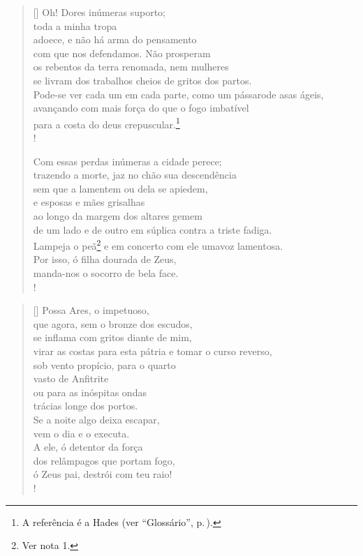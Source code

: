 \pagebreak
{}
\settowidth{\versewidth}{brilhante? Tenso, agito-me com medo em meu trêmulo}
\begin{verse}[\versewidth]
Oh! Dores inúmeras suporto;\\
toda a minha tropa\\
adoece, e não há arma do pensamento\\
com que nos defendamos. Não prosperam\\
os rebentos da terra renomada, nem mulheres\\
se livram dos trabalhos cheios de gritos dos partos.\\
Pode-se ver cada um em cada parte, como um pássaro\qb de asas ágeis,\\
avançando com mais força do que o fogo imbatível\\
para a costa do deus crepuscular.\footnote{A referência é a Hades (ver ``Glossário'', p.\,\pageref{glossario}).}\\!

Com essas perdas inúmeras a cidade perece;\\ %
trazendo a morte, jaz no chão sua descendência\\
sem que a lamentem ou dela se apiedem,\\
e esposas e mães grisalhas\\
ao longo da margem dos altares gemem\\
de um lado e de outro em súplica contra a triste fadiga.\\
Lampeja o peã\footnote{Ver nota 1.} %
e em concerto com ele uma\qb voz lamentosa.\\
Por isso, ó filha dourada de Zeus,\\
manda-nos o socorro de bela face.\\!
\end{verse} 

\settowidth{\versewidth}{brilhante? Tenso, agito-me com medo em meu trêmulo}
\begin{verse}[\versewidth]
Possa Ares, o impetuoso,\\
que agora, sem o bronze dos escudos,\\
se inflama com gritos diante de mim,\\
virar as costas para esta pátria e tomar o curso reverso,\\
sob vento propício, para o quarto\\
vasto de Anfitrite\\
ou para as inóspitas ondas\\
trácias longe dos portos.\\
Se a noite algo deixa escapar,\\
vem o dia e o executa.\\
A ele, ó detentor da força\\
dos relâmpagos que portam fogo,\\
ó Zeus pai, destrói com teu raio!\\!
\end{verse}

